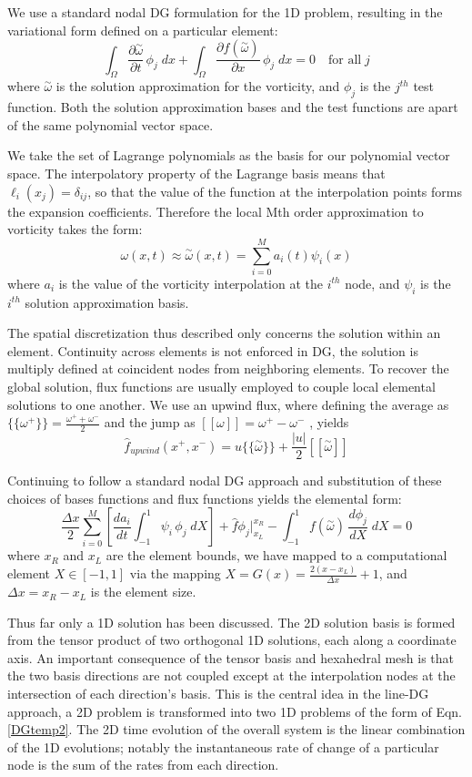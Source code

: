 \documentclass[]{aiaa-tc}%
\newcommand{\be}{\begin{equation}}
\newcommand{\ben}[1]{\begin{equation}\label{#1}}
\newcommand{\ee}{\end{equation}}
\newcommand{\aomega}{\overset{\sim}{\omega}}				%
\begin{document}
We use a standard nodal DG formulation\cite{HestWar} for the 1D problem, resulting in the variational form defined on a particular element:
\be \int_\Omega \frac{\partial \aomega}{\partial t} \, \phi_j \;dx + \int_\Omega \frac{\partial f(\aomega)}{\partial x} \, \phi_j \;dx = 0 \quad\mbox{for all}\; j\ee
where $\aomega$ is the solution approximation for the vorticity, and $\phi_j$ is the $j^{th}$ test function.  Both the solution approximation bases and the test functions are apart of the same polynomial vector space.

We take the set of Lagrange polynomials as the basis for our polynomial vector space. The interpolatory property of the Lagrange basis means that $\ell_i(x_j) = \delta_{ij}$, so that the value of the function at the interpolation points forms the expansion coefficients. Therefore the local Mth order approximation to vorticity takes the form:
\be \omega(x,t) \approx \aomega(x,t) = \sum_{i=0}^M a_i(t)\psi_i(x)\ee
where $a_i$ is the value of the vorticity interpolation at the $i^{th}$ node, and $\psi_i$ is the $i^{th}$ solution approximation basis.

The spatial discretization thus described only concerns the solution within an element. Continuity across elements is not enforced in DG, the solution is multiply defined at coincident nodes from neighboring elements. To recover the global solution, flux functions are usually employed to couple local elemental solutions to one another. We use an upwind flux, where defining the average as $\{\!\{\omega^+\}\!\} = \frac{\omega^++\omega^-}{2}$ and the jump as $[[\omega]]=\omega^+-\omega^-$ \cite{HestWar}, yields
\be \hat{f}_{upwind}(x^+,x^-)=u\{\!\{\aomega\}\!\} + \frac{|u|}{2}[[\aomega]]\ee

Continuing to follow a standard nodal DG approach and substitution of these choices of bases functions and flux functions yields the elemental form:
\ben{DGtemp2} \frac{\Delta x}{2}	\sum_{i=0}^M \left[ \frac{d a_i}{dt}	\int_{-1}^{1}\psi_i  \, \phi_j \;dX \right]
+\hat{f}\phi_j \Big|^{x_R}_{x_L} 
- \int_{-1}^{1} f(\aomega) \, \frac{d \phi_j}{dX} \;dX = 0 \ee
where $x_R$ and $x_L$ are the element bounds, we have mapped to a computational element $X \in [-1, 1]$ via the mapping $X=G(x)=\frac{2(x-x_L)}{\Delta x}+1$, and $\Delta x = x_R - x_L$ is the element size.

Thus far only a 1D solution has been discussed. The 2D solution basis is formed from the tensor product of two orthogonal 1D solutions, each along a coordinate axis. An important consequence of the tensor basis and hexahedral mesh is that the two basis directions are not coupled except at the interpolation nodes at the intersection of each direction's basis. This is the central idea in the line-DG \cite{Persson2013} approach, a 2D problem is transformed into two 1D problems of the form of Eqn.\,\eqref{DGtemp2}. The 2D time evolution of the overall system is the linear combination of the 1D evolutions; notably the instantaneous rate of change of a particular node is the sum of the rates from each direction.
\end{document}
